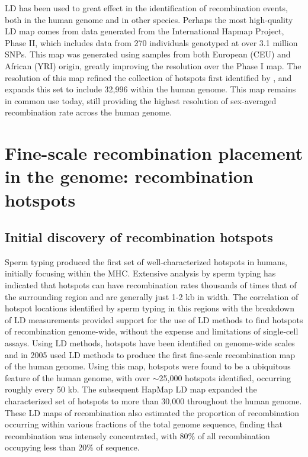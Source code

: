LD has been used to great effect in the identification of recombination events, both in the human genome and in other species.
Perhaps the most high-quality LD map comes from data generated from the International Hapmap Project, Phase II\cite{hapmap2007}, which includes data from 270 individuals genotyped at over 3.1 million SNPs.
This map was generated using samples from both European (CEU) and African (YRI) origin, greatly improving the resolution over the Phase I map.
The resolution of this map refined the collection of hotspots first identified by \citet{Myers2005}, and expands this set to include 32,996 within the human genome.
This map remains in common use today, still providing the highest resolution of sex-averaged recombination rate across the human genome.


\section[Fine-scale recombination placement in the genome]{Fine-scale recombination placement in the genome: recombination hotspots}

\subsection{Initial discovery of recombination hotspots}

Sperm typing produced the first set of well-characterized hotspots in humans, initially focusing within the MHC\cite{Jeffreys2000,Jeffreys2001}.
Extensive analysis by sperm typing has indicated that hotspots can have recombination rates thousands of times that of the surrounding region and are generally just 1-2 kb in width\cite{Jeffreys2004a,Arnheim2003}.
The correlation of hotspot locations identified by sperm typing in this regions with the breakdown of LD measurements provided support for the use of LD methods to find hotspots of recombination genome-wide, without the expense and limitations of single-cell assays\cite{Jeffreys2001}.
Using LD methods\cite{Mcvean2004}, hotspots have been identified on genome-wide scales and in 2005 \citet{Myers2005} used LD methods to produce the first fine-scale recombination map of the human genome.
Using this map, hotspots were found to be a ubiquitous feature of the human genome, with over $\sim$25,000 hotspots identified, occurring roughly every 50 kb.
The subsequent HapMap LD map expanded the characterized set of hotspots to more than 30,000 throughout the human genome\cite{hapmap2007}.
These LD maps of recombination also estimated the proportion of recombination occurring within various fractions of the total genome sequence, finding that recombination was intensely concentrated, with 80\% of all recombination occupying less than 20\% of sequence.


